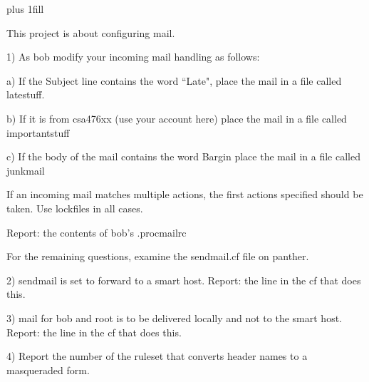 
\rightskip=0pt plus 1fill

\parindent 0pt

This project is about configuring mail.

1) As {\ltt{}bob} modify your incoming mail handling as follows:

a) If the Subject line contains the word ``Late",
place the mail in a file called {\ltt{}latestuff}.

b) If it is from {\ltt{}csa476xx} (use your account here)
place the mail in a file called {\ltt{}importantstuff}

c) If the body of the mail contains the word {\ltt{}Bargin}
place the mail in a file called {\ltt{}junkmail}

If an incoming mail matches multiple actions, the first actions
specified should be taken.
Use lockfiles in all cases.

Report: the contents of bob's {\ltt{}.procmailrc}

For the remaining questions, examine the {\ltt{}sendmail.cf}
file on {\ltt{}panther}.

2) sendmail is set to forward to a smart host.
Report: the line in the {\ltt{}cf} that does this.

3) mail for {\ltt{}bob} and {\ltt{}root} is to be delivered locally and
not to the smart host.
Report: the line in the {\ltt{}cf} that does this.

4) Report the number of the ruleset that converts header
names to a masqueraded form.
\bye
